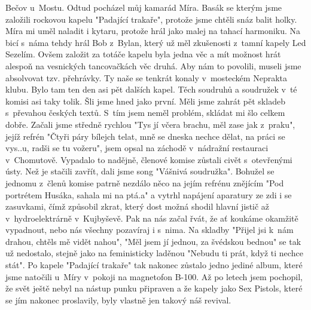 
Bečov u~Mostu. Odtud pocházel můj kamarád Míra. Basák se kterým jsme
založili rockovou kapelu "Padající trakaře", protože jsme chtěli snáz
balit holky. Míra mi uměl naladit i kytaru, protože hrál jako malej na
tahací harmoniku. Na bicí s~náma tehdy hrál Bob z~Bylan, který už měl
zkušenosti z~tamní kapely Led Sezelím. Ovšem založit za totáče kapelu
byla jedna věc a mít možnost hrát alespoň na vesnických tancovačkách
věc druhá. Aby nám to povolili, museli jsme absolvovat tzv. přehrávky.
Ty naše se tenkrát konaly v~mosteckém Neprakta klubu. Bylo tam ten den
asi pět dalších kapel. Těch soudruhů a soudružek v~té komisi asi taky
tolik. Šli jsme hned jako první. Měli jsme zahrát pět skladeb
s~převahou českých textů. S~tím jsem neměl problém, skládat mi šlo
celkem dobře. Začali jsme středně rychlou "Tys jí včera brachu, měl
zase jak z~praku", jejíž refrén "Čtyři páry bílejch telat, mně se
dneska nechce dělat, na práci se vys..u, radši se tu vožeru", jsem
opsal na záchodě v~nádražní restauraci v~Chomutově. Vypadalo to
nadějně, členové komise zůstali civět s~otevřenými ústy. Než je
stačili zavřít, dali jsme song "Vášnivá soudružka". Bohužel se jednomu
z~členů komise patrně nezdálo něco na jejím refrénu znějícím "Pod
portrétem Husáka, sahala mi na ptá.a" a vytrhl napájení aparatury ze
zdi i se zasuvkami, čímž způsobil zkrat, který dost možná shodil
hlavní jistič až v~hydroelektrárně v~Kujbyševě. Pak na nás začal řvát,
že ať koukáme okamžitě vypadnout, nebo nás všechny pozavíraj i
s~nima. Na skladby "Přijel jsi k~nám drahou, chtěls mě vidět nahou",
"Měl jsem jí jednou, za švédskou bednou" se tak už nedostalo, stejně
jako na feministicky laděnou "Nebudu ti prát, když ti nechce stát". Po
kapele "Padající trakaře" tak nakonec zůstalo jedno jediné album,
které jsme natočili u~Míry v~pokoji na magnetofon B-100. Až po letech
jsem pochopil, že svět ještě nebyl na nástup punku připraven a že
kapely jako Sex Pistols, které se jím nakonec proslavily, byly vlastně
jen takový náš revival.
